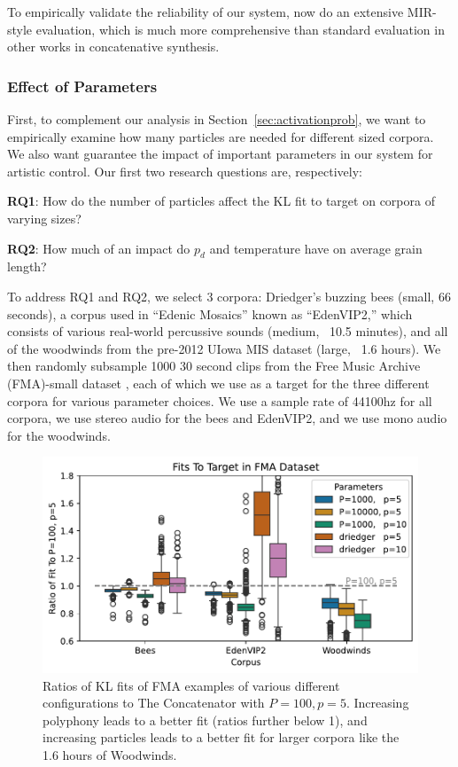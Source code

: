 \documentclass{article}
\begin{document}
To empirically validate the reliability of our system, now do an extensive MIR-style evaluation, which is much more comprehensive than standard evaluation in other works in concatenative synthesis.

\subsubsection{Effect of Parameters}
\label{sec:quantitativeparams}

First, to complement our analysis in Section~\ref{sec:activationprob}, we want to empirically examine how many particles are needed for different sized corpora.  We also want guarantee the impact of important parameters in our system for artistic control.  Our first two research questions are, respectively:

\textbf{RQ1}: How do the number of particles affect the KL fit to target on corpora of varying sizes?

\textbf{RQ2}: How much of an impact do $p_d$ and temperature have on average grain length?

To address RQ1 and RQ2, we select 3 corpora: Driedger's buzzing bees (small, 66 seconds), a corpus used in ``Edenic Mosaics''\cite{cantil2021} known as ``EdenVIP2,'' which consists of various real-world percussive sounds (medium, ~10.5 minutes), and all of the woodwinds from the pre-2012 UIowa MIS dataset \cite{uiowadataset} (large, ~1.6 hours).  We then randomly subsample 1000 30 second clips from the Free Music Archive (FMA)-small dataset \cite{fma_dataset}, each of which we use as a target for the three different corpora for various parameter choices.  We use a sample rate of 44100hz for all corpora, we use stereo audio for the bees and EdenVIP2, and we use mono audio for the woodwinds.

\begin{figure}
    \centering
    \includegraphics[width=\columnwidth]{figs/FMAFit.pdf}
    \caption{Ratios of KL fits of FMA examples of various different configurations to The Concatenator with $P=100, p=5$.  Increasing polyphony leads to a better fit (ratios further below 1), and increasing particles leads to a better fit for larger corpora like the 1.6 hours of Woodwinds.}
    \label{fig:fmafit}
\end{figure}
\end{document}
